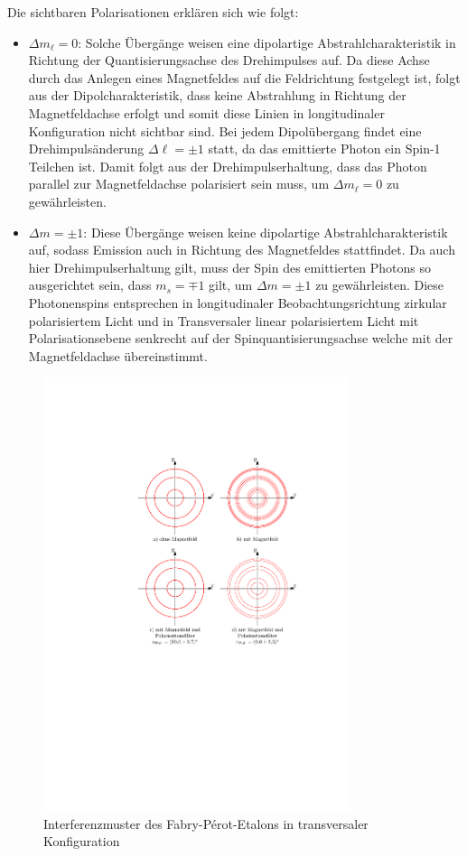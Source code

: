 \documentclass[11pt, a4paper]{article}
\begin{document}
Die sichtbaren Polarisationen erklären sich wie folgt:
\begin{itemize}
	\item $\Delta m_\ell = 0$: Solche Übergänge weisen eine dipolartige Abstrahlcharakteristik in Richtung der Quantisierungsachse des Drehimpulses auf.
	Da diese Achse durch das Anlegen eines Magnetfeldes auf die Feldrichtung festgelegt ist, folgt aus der Dipolcharakteristik, dass keine Abstrahlung in Richtung der Magnetfeldachse erfolgt und somit diese Linien in longitudinaler Konfiguration nicht sichtbar sind.
	Bei jedem Dipolübergang findet eine Drehimpulsänderung $\Delta \ell = \pm 1$ statt, da das emittierte Photon ein Spin-1 Teilchen ist.
	Damit folgt aus der Drehimpulserhaltung, dass das Photon parallel zur Magnetfeldachse polarisiert sein muss, um $\Delta m_\ell = 0$ zu gewährleisten.
	
	\item $\Delta m = \pm 1$: Diese Übergänge weisen keine dipolartige Abstrahlcharakteristik auf, sodass Emission auch in Richtung des Magnetfeldes stattfindet.
	Da auch hier Drehimpulserhaltung gilt, muss der Spin des emittierten Photons so ausgerichtet sein, dass $m_s = \mp 1$ gilt, um $\Delta m = \pm 1$ zu gewährleisten.
	Diese Photonenspins entsprechen in longitudinaler Beobachtungsrichtung zirkular polarisiertem Licht und in Transversaler linear polarisiertem Licht mit Polarisationsebene senkrecht auf der Spinquantisierungsachse welche mit der Magnetfeldachse übereinstimmt.
\end{itemize}


\begin{figure}[h]
	\centering
	\includegraphics[width=0.8\textwidth]{./figures/zeeman_transversal.pdf}
	\caption{Interferenzmuster des Fabry-Pérot-Etalons in transversaler Konfiguration}
	\label{fig:zeeman_transversal}
\end{figure}
\end{document}
